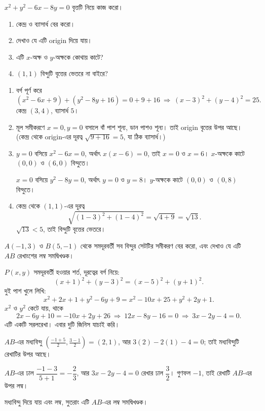\documentclass[11pt]{article}
\begin{document}
 $x^2 + y^2 - 6x - 8y = 0$ বৃত্তটি নিয়ে কাজ করো।
\begin{enumerate}
  \item কেন্দ্র ও ব্যাসার্ধ বের করো।
  \item দেখাও যে এটি origin দিয়ে যায়।
  \item এটি $x$-অক্ষ ও $y$-অক্ষকে কোথায় কাটে?
  \item $(1, 1)$ বিন্দুটি বৃত্তের ভেতরে না বাইরে?
\end{enumerate}

\begin{sol}
\begin{enumerate}
  \item বর্গ পূর্ণ করে
        \[
          (x^2 - 6x + 9) + (y^2 - 8y + 16) = 0 + 9 + 16
          \ \Longrightarrow\ (x-3)^2 + (y-4)^2 = 25 .
        \]
        কেন্দ্র $(3, 4)$, ব্যাসার্ধ $5$।
  \item মূল সমীকরণে $x = 0, y = 0$ বসালে বাঁ পাশ শূন্য, ডান পাশও শূন্য।
        তাই origin বৃত্তের উপর আছে। (কেন্দ্র থেকে origin-এর দূরত্ব
        $\sqrt{9+16} = 5$, যা ঠিক ব্যাসার্ধ।)
  \item $y = 0$ বসিয়ে $x^2 - 6x = 0$, অর্থাৎ $x(x-6) = 0$, তাই $x = 0$ ও
        $x = 6$। $x$-অক্ষকে কাটে $(0,0)$ ও $(6,0)$ বিন্দুতে।

        $x = 0$ বসিয়ে $y^2 - 8y = 0$, অর্থাৎ $y = 0$ ও $y = 8$। $y$-অক্ষকে
        কাটে $(0,0)$ ও $(0,8)$ বিন্দুতে।
  \item কেন্দ্র থেকে $(1,1)$-এর দূরত্ব
        \[
          \sqrt{(1-3)^2 + (1-4)^2} = \sqrt{4 + 9} = \sqrt{13} .
        \]
        $\sqrt{13} < 5$, তাই বিন্দুটি বৃত্তের ভেতরে।
\end{enumerate}
\end{sol}

 $A(-1, 3)$ ও $B(5, -1)$ থেকে সমদূরবর্তী সব বিন্দুর সেটটির সমীকরণ
বের করো, এবং দেখাও যে এটি $AB$ রেখাংশের লম্ব সমদ্বিখণ্ডক।

\begin{sol}
$P(x,y)$ সমদূরবর্তী হওয়ার শর্ত, দূরত্বের বর্গ নিয়ে:
\[
  (x+1)^2 + (y-3)^2 = (x-5)^2 + (y+1)^2 .
\]
দুই পাশ খুলে লিখি:
\[
  x^2 + 2x + 1 + y^2 - 6y + 9 = x^2 - 10x + 25 + y^2 + 2y + 1 .
\]
$x^2$ ও $y^2$ কেটে যায়, থাকে
\[
  2x - 6y + 10 = -10x + 2y + 26
  \ \Longrightarrow\ 12x - 8y - 16 = 0
  \ \Longrightarrow\ 3x - 2y - 4 = 0 .
\]
এটি একটি সরলরেখা। এবার দুটি জিনিস যাচাই করি।

$AB$-এর মধ্যবিন্দু $\left( \tfrac{-1+5}{2}, \tfrac{3-1}{2} \right) = (2, 1)$,
আর $3(2) - 2(1) - 4 = 0$; তাই মধ্যবিন্দুটি রেখাটির উপর আছে।

$AB$-এর ঢাল $\dfrac{-1-3}{5+1} = -\dfrac{2}{3}$, আর $3x - 2y - 4 = 0$ রেখার
ঢাল $\dfrac{3}{2}$। গুণফল $-1$, তাই রেখাটি $AB$-এর উপর লম্ব।

মধ্যবিন্দু দিয়ে যায় এবং লম্ব, সুতরাং এটি $AB$-এর লম্ব সমদ্বিখণ্ডক।
\end{sol}
\end{document}
